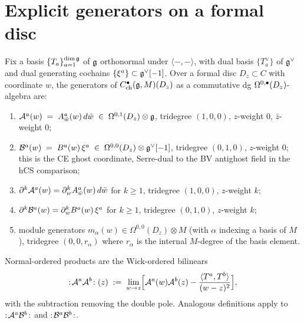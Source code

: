 \section{Explicit generators on a formal disc}
\label{sec:ch-ce-generators}

\begin{definition}
\label{def:ch-ce-generators}
%
Fix a basis $\{T_a\}_{a=1}^{\dim\mathfrak{g}}$ of $\mathfrak{g}$ orthonormal under
$\langle-,-\rangle$, with dual basis $\{T_a^\vee\}$ of $\mathfrak{g}^\vee$ and
dual generating cochains $\{\xi^a\}\subset\mathfrak{g}^\vee[-1]$. Over a formal
disc $D_z\subset C$ with coordinate $w$, the generators of
$C^\bullet_{\mathrm{ch}}(\mathfrak{g},M)(D_z)$ as a commutative dg
$\Omega^{0,\bullet}(D_z)$-algebra are:
\begin{enumerate}[label=\textup{(G\arabic*)},ref=G\arabic*]
\item\label{gen:ch-A}
$\mathcal{A}^a(w) \;=\; A^a_{\bar w}(w)\,d\bar w \;\in\;
\Omega^{0,1}(D_z)\otimes\mathfrak{g}$, tridegree $(1,0,0)$, $z$-weight $0$,
$\bar z$-weight $0$;
\item\label{gen:ch-B}
$\mathcal{B}^a(w) \;=\; B^a(w)\,\xi^a \;\in\;
\Omega^{0,0}(D_z)\otimes\mathfrak{g}^\vee[-1]$, tridegree $(0,1,0)$,
$z$-weight $0$; this is the CE ghost coordinate, Serre-dual to the
BV antighost field in the hCS comparison;
\item\label{gen:ch-dA}
$\partial^k\mathcal{A}^a(w) = \partial_w^k A^a_{\bar w}(w)\,d\bar w$
for $k\ge 1$, tridegree $(1,0,0)$, $z$-weight $k$;
\item\label{gen:ch-dB}
$\partial^k\mathcal{B}^a(w) = \partial_w^k B^a(w)\,\xi^a$ for $k\ge 1$,
tridegree $(0,1,0)$, $z$-weight $k$;
\item\label{gen:ch-M}
module generators $m_\alpha(w)\in\Omega^{0,0}(D_z)\otimes M$
(with $\alpha$ indexing a basis of $M$), tridegree $(0,0,r_\alpha)$
where $r_\alpha$ is the internal $M$-degree of the basis element.
\end{enumerate}
Normal-ordered products are the Wick-ordered bilinears
\begin{equation}
\label{eq:normal-ordered-products}
:\!\mathcal{A}^a\mathcal{A}^b\!:(z)
\;:=\;
\lim_{w\to z}
\Bigl[\mathcal{A}^a(w)\mathcal{A}^b(z) - \frac{\langle T^a,T^b\rangle}{(w-z)^2}
\Bigr],
\end{equation}
with the subtraction removing the double pole. Analogous definitions
apply to $:\!\mathcal{A}^a\mathcal{B}^b\!:$ and $:\!\mathcal{B}^a\mathcal{B}^b\!:$.
\end{definition}


